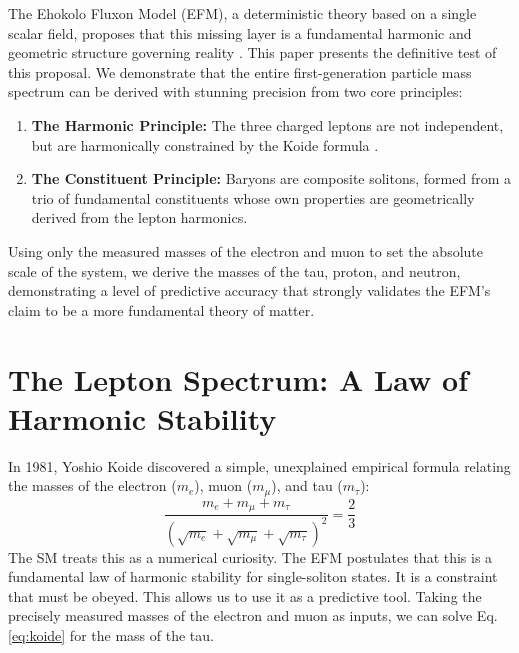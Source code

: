 \documentclass[11pt, twoside]{article}
\begin{document}
The Ehokolo Fluxon Model (EFM), a deterministic theory based on a single scalar field, proposes that this missing layer is a fundamental harmonic and geometric structure governing reality \citep{efm_cosmogenesis}. This paper presents the definitive test of this proposal. We demonstrate that the entire first-generation particle mass spectrum can be derived with stunning precision from two core principles:
\begin{enumerate}
    \item \textbf{The Harmonic Principle:} The three charged leptons are not independent, but are harmonically constrained by the Koide formula \citep{Koide1981}.
    \item \textbf{The Constituent Principle:} Baryons are composite solitons, formed from a trio of fundamental constituents whose own properties are geometrically derived from the lepton harmonics.
\end{enumerate}
Using only the measured masses of the electron and muon to set the absolute scale of the system, we derive the masses of the tau, proton, and neutron, demonstrating a level of predictive accuracy that strongly validates the EFM's claim to be a more fundamental theory of matter.

\section{The Lepton Spectrum: A Law of Harmonic Stability}
In 1981, Yoshio Koide discovered a simple, unexplained empirical formula relating the masses of the electron (\(m_e\)), muon (\(m_\mu\)), and tau (\(m_\tau\)):
\begin{equation}
\frac{m_e + m_\mu + m_\tau}{(\sqrt{m_e} + \sqrt{m_\mu} + \sqrt{m_\tau})^2} = \frac{2}{3}
\label{eq:koide}
\end{equation}
The SM treats this as a numerical curiosity. The EFM postulates that this is a fundamental law of harmonic stability for single-soliton states. It is a constraint that must be obeyed. This allows us to use it as a predictive tool. Taking the precisely measured masses of the electron and muon as inputs, we can solve Eq. \ref{eq:koide} for the mass of the tau.
\end{document}
